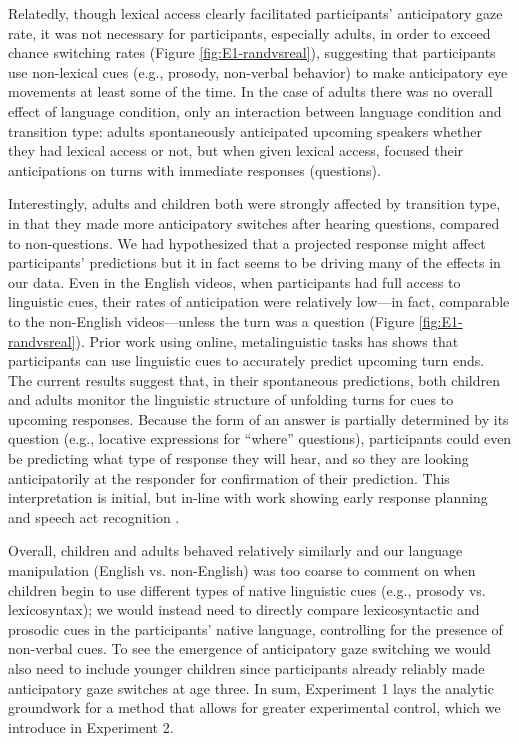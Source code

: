 \documentclass[authoryear, 12pt]{elsarticle}
\begin{document}
Relatedly, though lexical access clearly facilitated participants' anticipatory gaze rate, it was not necessary for participants, especially adults, in order to exceed chance switching rates (Figure \ref{fig:E1-randvsreal}), suggesting that participants use non-lexical cues (e.g., prosody, non-verbal behavior) to make anticipatory eye movements at least some of the time. In the case of adults there was no overall effect of language condition, only an interaction between language condition and transition type: adults spontaneously anticipated upcoming speakers whether they had lexical access or not, but when given lexical access, focused their anticipations on turns with immediate responses (questions).

Interestingly, adults and children both were strongly affected by transition type, in that they made more anticipatory switches after hearing questions, compared to non-questions. We had hypothesized that a projected response might affect participants' predictions but it in fact seems to be driving many of the effects in our data. Even in the English videos, when participants had full access to linguistic cues, their rates of anticipation were relatively low---in fact, comparable to the non-English videos---unless the turn was a question (Figure \ref{fig:E1-randvsreal}). Prior work using online, metalinguistic tasks has shows that participants can use linguistic cues to accurately predict upcoming turn ends. The current results suggest that, in their spontaneous predictions, both children and adults monitor the linguistic structure of unfolding turns for cues to upcoming responses. Because the form of an answer is partially determined by its question (e.g., locative expressions for ``where'' questions), participants could even be predicting what type of response they will hear, and so they are looking anticipatorily at the responder for confirmation of their prediction. This interpretation is initial, but in-line with work showing early response planning and speech act recognition \citep{gisladottir2015, bogels2015}.

Overall, children and adults behaved relatively similarly and our language manipulation (English vs. non-English) was too coarse to comment on when children begin to use different types of native linguistic cues (e.g., prosody vs. lexicosyntax); we would instead need to directly compare lexicosyntactic and prosodic cues in the participants' native language, controlling for the presence of non-verbal cues. To see the emergence of anticipatory gaze switching we would also need to include younger children since participants already reliably made anticipatory gaze switches at age three. In sum, Experiment 1 lays the analytic groundwork for a method that allows for greater experimental control, which we introduce in Experiment 2. 
\end{document}
